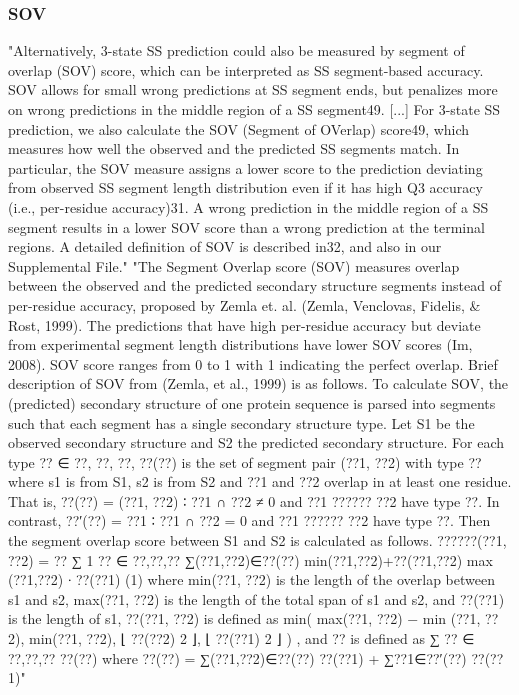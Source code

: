 \documentclass[]{scrartcl}
\begin{document}
\subsubsection{SOV}
"Alternatively, 3-state SS prediction could also be measured by segment of overlap (SOV) score, which can be interpreted as SS segment-based accuracy. SOV allows for small wrong predictions at SS segment ends, but penalizes more on wrong predictions in the middle region of a SS segment49. [...]
For 3-state SS prediction, we also calculate the SOV (Segment of OVerlap) score49, which measures how well the observed and the predicted SS segments match. In particular, the SOV measure assigns a lower score to the prediction deviating from observed SS segment length distribution even if it has high Q3 accuracy (i.e., per-residue accuracy)31. A wrong prediction in the middle region of a SS segment results in a lower SOV score than a wrong prediction at the terminal regions. A detailed definition of SOV is described in32, and also in our Supplemental File." \cite{Wang2016}
"The Segment Overlap score (SOV) measures overlap between the observed and the predicted secondary structure segments instead of per-residue accuracy, proposed by Zemla et. al. (Zemla, Venclovas, Fidelis, \& Rost, 1999). The predictions that have high per-residue accuracy but deviate from experimental segment length distributions have lower SOV scores (Im, 2008). SOV score ranges from 0 to 1 with 1 indicating the perfect overlap. Brief description of SOV from (Zemla, et al., 1999) is as follows. To calculate SOV, the (predicted) secondary structure of one protein sequence is parsed into segments such that each segment has a single secondary structure type. Let S1 be the observed secondary structure and S2 the predicted secondary structure. For each type ?? ∈ {??, ??, ??}, ??(??) is the set of segment pair (??1, ??2) with type ?? where s1 is from S1, s2 is from S2 and ??1 and ??2 overlap in at least one residue. That is, ??(??) = {(??1, ??2) ∶ ??1 ∩ ??2 ≠ 0 and ??1 ?????? ??2 have type ??}. In contrast, ??′(??) = {??1 ∶ ??1 ∩ ??2 = 0 and ??1 ?????? ??2 have type ??}.
Then the segment overlap score between S1 and S2 is calculated as follows.
??????(??1, ??2) =
?? ∑ 1
?? ∈ {??,??,??} ∑(??1,??2)∈??(??)
min(??1,??2)+??(??1,??2) max (??1,??2)
∙ ??(??1) (1)
where min(??1, ??2) is the length of the overlap between s1 and s2, max(??1, ??2) is the length of the total span of s1 and s2, and ??(??1) is the length of s1, ??(??1, ??2) is defined as min( max(??1, ??2) − min (??1, ??2), min(??1, ??2),
⌊
??(??2) 2 ⌋, ⌊
??(??1) 2 ⌋ ) , and ?? is defined as ∑
?? ∈ {??,??,??} ??(??) where ??(??) = ∑(??1,??2)∈??(??) ??(??1) + ∑??1∈??′(??) ??(??1)" \cite{Wang2016}
\end{document}
